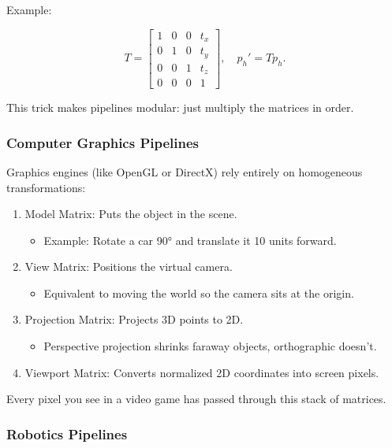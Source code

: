 \documentclass[
  letterpaper,
  DIV=11,
  numbers=noendperiod]{scrreprt}
\providecommand{\tightlist}{%
  \setlength{\itemsep}{0pt}\setlength{\parskip}{0pt}}
\begin{document}
Example:

\[
T = \begin{bmatrix} 
1 & 0 & 0 & t_x \\ 
0 & 1 & 0 & t_y \\ 
0 & 0 & 1 & t_z \\ 
0 & 0 & 0 & 1 
\end{bmatrix}, \quad 
p_h' = T p_h.
\]

This trick makes pipelines modular: just multiply the matrices in order.

\subsubsection{Computer Graphics
Pipelines}\label{computer-graphics-pipelines}

Graphics engines (like OpenGL or DirectX) rely entirely on homogeneous
transformations:

\begin{enumerate}
\def\labelenumi{\arabic{enumi}.}
\item
  Model Matrix: Puts the object in the scene.

  \begin{itemize}
  \tightlist
  \item
    Example: Rotate a car 90° and translate it 10 units forward.
  \end{itemize}
\item
  View Matrix: Positions the virtual camera.

  \begin{itemize}
  \tightlist
  \item
    Equivalent to moving the world so the camera sits at the origin.
  \end{itemize}
\item
  Projection Matrix: Projects 3D points to 2D.

  \begin{itemize}
  \tightlist
  \item
    Perspective projection shrinks faraway objects, orthographic
    doesn't.
  \end{itemize}
\item
  Viewport Matrix: Converts normalized 2D coordinates into screen
  pixels.
\end{enumerate}

Every pixel you see in a video game has passed through this stack of
matrices.

\subsubsection{Robotics Pipelines}\label{robotics-pipelines}
\end{document}

